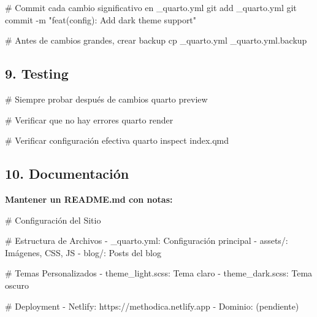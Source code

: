 \documentclass[
  doc,
  floatsintext,
  longtable,
  a4paper,
  nolmodern,
  notxfonts,
  notimes,
  12pt,
  colorlinks=true,linkcolor=blue,citecolor=blue,urlcolor=blue]{apa7}
\newenvironment{Shaded}{\begin{snugshade}}{\end{snugshade}}
\newcommand{\AttributeTok}[1]{\textcolor[rgb]{0.40,0.45,0.13}{#1}}
\newcommand{\CommentTok}[1]{\textcolor[rgb]{0.37,0.37,0.37}{#1}}
\newcommand{\ExtensionTok}[1]{\textcolor[rgb]{0.00,0.23,0.31}{#1}}
\newcommand{\FunctionTok}[1]{\textcolor[rgb]{0.28,0.35,0.67}{#1}}
\newcommand{\InformationTok}[1]{\textcolor[rgb]{0.37,0.37,0.37}{#1}}
\newcommand{\NormalTok}[1]{\textcolor[rgb]{0.00,0.23,0.31}{#1}}
\newcommand{\SpecialStringTok}[1]{\textcolor[rgb]{0.13,0.47,0.30}{#1}}
\newcommand{\StringTok}[1]{\textcolor[rgb]{0.13,0.47,0.30}{#1}}
\begin{document}
\begin{Shaded}
\begin{Highlighting}[]
\CommentTok{\# Commit cada cambio significativo en \_quarto.yml}
\FunctionTok{git}\NormalTok{ add \_quarto.yml}
\FunctionTok{git}\NormalTok{ commit }\AttributeTok{{-}m} \StringTok{"feat(config): Add dark theme support"}

\CommentTok{\# Antes de cambios grandes, crear backup}
\FunctionTok{cp}\NormalTok{ \_quarto.yml \_quarto.yml.backup}
\end{Highlighting}
\end{Shaded}

\subsection{9. Testing}\label{testing}

\begin{Shaded}
\begin{Highlighting}[]
\CommentTok{\# Siempre probar después de cambios}
\ExtensionTok{quarto}\NormalTok{ preview}

\CommentTok{\# Verificar que no hay errores}
\ExtensionTok{quarto}\NormalTok{ render}

\CommentTok{\# Verificar configuración efectiva}
\ExtensionTok{quarto}\NormalTok{ inspect index.qmd}
\end{Highlighting}
\end{Shaded}

\subsection{10. Documentación}\label{documentaciuxf3n}

\textbf{Mantener un README.md con notas:}

\begin{Shaded}
\begin{Highlighting}[]
\FunctionTok{\# Configuración del Sitio}

\FunctionTok{\# Estructura de Archivos}
\SpecialStringTok{{-} }\InformationTok{\textasciigrave{}\_quarto.yml\textasciigrave{}}\NormalTok{: Configuración principal}
\SpecialStringTok{{-} }\InformationTok{\textasciigrave{}assets/\textasciigrave{}}\NormalTok{: Imágenes, CSS, JS}
\SpecialStringTok{{-} }\InformationTok{\textasciigrave{}blog/\textasciigrave{}}\NormalTok{: Posts del blog}

\FunctionTok{\# Temas Personalizados}
\SpecialStringTok{{-} }\InformationTok{\textasciigrave{}theme\_light.scss\textasciigrave{}}\NormalTok{: Tema claro}
\SpecialStringTok{{-} }\InformationTok{\textasciigrave{}theme\_dark.scss\textasciigrave{}}\NormalTok{: Tema oscuro}

\FunctionTok{\# Deployment}
\SpecialStringTok{{-} }\NormalTok{Netlify: https://methodica.netlify.app}
\SpecialStringTok{{-} }\NormalTok{Dominio: (pendiente)}
\end{Highlighting}
\end{Shaded}
\end{document}
